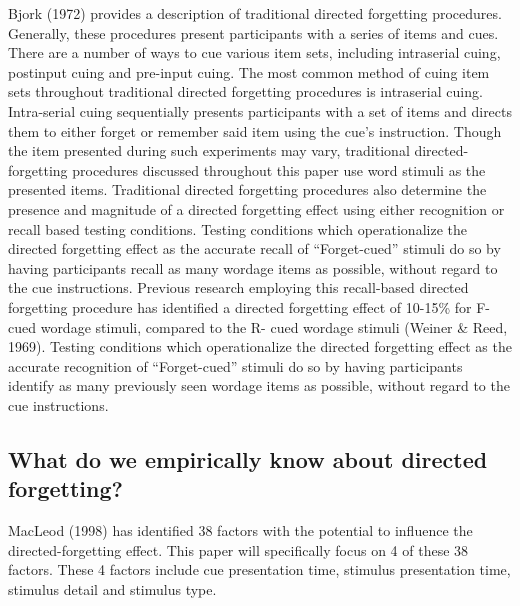 \documentclass[
  man,floatsintext]{apa6}
\begin{document}
Bjork (1972) provides a description of traditional directed forgetting procedures. Generally, these procedures present participants with a series of items and cues. There are a number of ways to cue various item sets, including intraserial cuing, postinput cuing and pre-input cuing. The most common method of cuing item sets throughout traditional directed forgetting procedures is intraserial cuing. Intra-serial cuing sequentially presents participants with a set of items and directs them to either forget or remember said item using the cue's instruction. Though the item presented during such experiments may vary, traditional directed-forgetting procedures discussed throughout this paper use word stimuli as the presented items.
Traditional directed forgetting procedures also determine the presence and magnitude of a directed forgetting effect using either recognition or recall based testing conditions. Testing conditions which operationalize the directed forgetting effect as the accurate recall of ``Forget-cued'' stimuli do so by having participants recall as many wordage items as possible, without regard to the cue instructions. Previous research employing this recall-based directed forgetting procedure has identified a directed forgetting effect of 10-15\% for F- cued wordage stimuli, compared to the R- cued wordage stimuli (Weiner \& Reed, 1969). Testing conditions which operationalize the directed forgetting effect as the accurate recognition of ``Forget-cued'' stimuli do so by having participants identify as many previously seen wordage items as possible, without regard to the cue instructions.

\hypertarget{what-do-we-empirically-know-about-directed-forgetting}{%
\subsection{What do we empirically know about directed forgetting?}\label{what-do-we-empirically-know-about-directed-forgetting}}

MacLeod (1998) has identified 38 factors with the potential to influence the directed-forgetting effect. This paper will specifically focus on 4 of these 38 factors. These 4 factors include cue presentation time, stimulus presentation time, stimulus detail and stimulus type.
\end{document}
